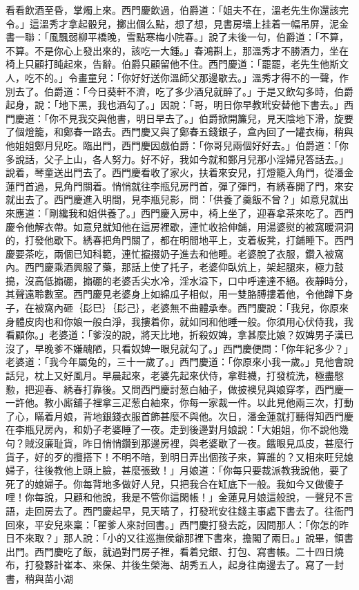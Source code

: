 \begin{showcontents}{}
看看飲酒至昏，掌燭上來。西門慶飲過，伯爵道：「姐夫不在，溫老先生你還該完令。」這溫秀才拿起骰兒，擲出個么點，想了想，見書房墻上挂着一幅吊屏，泥金書一聯：「風飄弱柳平橋晚，雪點寒梅小院春。」說了未後一句，伯爵道：「不算，不算。不是你心上發出來的，該吃一大鍾。」春鴻斟上，那溫秀才不勝酒力，坐在椅上只顧打盹起來，告辭。伯爵只顧留他不住。西門慶道：「罷罷，老先生他斯文人，吃不的。」令畫童兒：「你好好送你溫師父那邊歇去。」溫秀才得不的一聲，作別去了。伯爵道：「今日葵軒不濟，吃了多少酒兒就醉了。」于是又飲勾多時，伯爵起身，說：「地下黑，我也酒勾了。」因說：「哥，明日你早教玳安替他下書去。」西門慶道：「你不見我交與他書，明日早去了。」伯爵掀開簾兒，見天陰地下滑，旋要了個燈籠，和鄭春一路去。西門慶又與了鄭春五錢銀子，盒內回了一罐衣梅，稍與他姐姐鄭月兒吃。臨出門，西門慶因戲伯爵：「你哥兒兩個好好去。」伯爵道：「你多說話，父子上山，各人努力。好不好，我如今就和鄭月兒那小淫婦兒答話去。」說着，琴童送出門去了。西門慶看收了家火，扶着來安兒，打燈籠入角門，從潘金蓮門首過，見角門關着。悄悄就往李瓶兒房門首，彈了彈門，有綉春開了門，來安就出去了。西門慶進入明間，見李瓶兒影，問：「供養了羹飯不曾？」如意兒就出來應道：「剛纔我和姐供養了。」西門慶入房中，椅上坐了，迎春拿茶來吃了。西門慶令他解衣帶。如意兒就知他在這房裡歇，連忙收拾伸鋪，用湯婆熨的被窩暖洞洞的，打發他歇下。綉春把角門關了，都在明間地平上，支着板凳，打鋪睡下。西門慶要茶吃，兩個已知科範，連忙攛掇奶子進去和他睡。老婆脫了衣服，鑽入被窩內。西門慶乘酒興服了藥，那話上使了托子，老婆仰臥炕上，架起腿來，極力鼓搗，沒高低搧硼，搧硼的老婆舌尖水冷，淫水溢下，口中呼達達不絕。夜靜時分，其聲遠聆數室。西門慶見老婆身上如綿瓜子相似，用一雙胳膊摟着他，令他蹲下身子，在被窩內砸｛髟巳｝｛髟己｝，老婆無不曲體承奉。西門慶說：「我兒，你原來身體皮肉也和你娘一般白淨，我摟着你，就如同和他睡一般。你須用心伏侍我，我看顧你。」老婆道：「爹沒的說，將天比地，折殺奴婢，拿甚麼比娘？奴婢男子漢已沒了，早晚爹不嫌醜陋，只看奴婢一眼兒就勾了。」西門慶便問：「你年紀多少？」老婆道：「我今年屬兔的，三十一歲了。」西門慶道：「你原來小我一歲。」見他會說話兒，枕上又好風月。早晨起來，老婆先起來伏侍，拿鞋襪，打發梳洗，極盡慇懃，把迎春、綉春打靠後。又問西門慶討葱白紬子，做披襖兒與娘穿孝，西門慶一一許他。教小廝舖子裡拿三疋葱白紬來，你每一家裁一件。以此見他兩三次，打動了心，瞞着月娘，背地銀錢衣服首飾甚麼不與他。次日，潘金蓮就打聽得知西門慶在李瓶兒房內，和奶子老婆睡了一夜。走到後邊對月娘說：「大姐姐，你不說他幾句？賊沒廉耻貨，昨日悄悄鑽到那邊房裡，與老婆歇了一夜。餓眼見瓜皮，甚麼行貨子，好的歹的攬搭下！不明不暗，到明日弄出個孩子來，算誰的？又相來旺兒媳婦子，往後教他上頭上臉，甚麼張致！」月娘道：「你每只要裁派教我說他，要了死了的媳婦子。你每背地多做好人兒，只把我合在缸底下一般。我如今又做傻子哩！你每說，只顧和他說，我是不管你這閑帳！」金蓮見月娘這般說，一聲兒不言語，走回房去了。西門慶起早，見天晴了，打發玳安往錢主事處下書去了。往衙門回來，平安兒來稟：「翟爹人來討回書。」西門慶打發去訖，因問那人：「你怎的昨日不來取？」那人說：「小的又往巡撫侯爺那裡下書來，擔閣了兩日。」說畢，領書出門。西門慶吃了飯，就過對門房子裡，看着兌銀、打包、寫書帳。二十四日燒布，打發夥計崔本、來保、并後生榮海、胡秀五人，起身往南邊去了。寫了一封書，稍與苗小湖
\end{showcontents}
